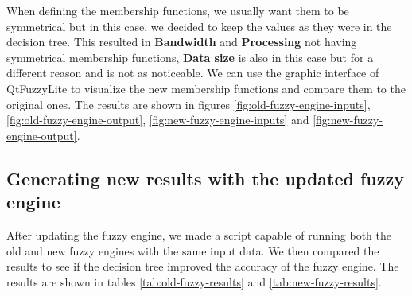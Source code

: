 When defining the membership functions, we usually want them to be symmetrical but in this case, we decided to keep the
values as they were in the decision tree. This resulted in \textbf{Bandwidth} and \textbf{Processing} not having
symmetrical membership functions, \textbf{Data size} is also in this case but for a different reason and is not as
noticeable. We can use the graphic interface of QtFuzzyLite to visualize the new membership functions and compare them
to the original ones. The results are shown in figures \ref{fig:old-fuzzy-engine-inputs}, \ref{fig:old-fuzzy-engine-output},
\ref{fig:new-fuzzy-engine-inputs} and \ref{fig:new-fuzzy-engine-output}.

\subsection{Generating new results with the updated fuzzy engine}
\label{subsec:new-fuzzy-results}

After updating the fuzzy engine, we made a script capable of running both the old and new fuzzy engines with the same
input data. We then compared the results to see if the decision tree improved the accuracy of the fuzzy engine. The
results are shown in tables \ref{tab:old-fuzzy-results} and \ref{tab:new-fuzzy-results}.

